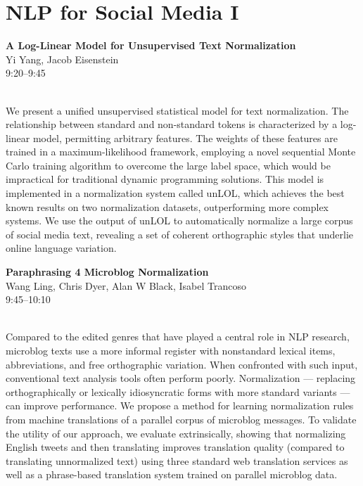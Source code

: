 \documentclass[twoside,makeidx]{book}
\begin{document}
\section{NLP for Social Media I}
\vspace{-1em}
\par\vspace{2em}\noindent%
\begin{minipage}{\linewidth}%
\begin{center}
\textbf{\normalsize A Log-Linear Model for Unsupervised Text Normalization}\\
\normalsize  Yi Yang,  Jacob Eisenstein\\
{\small 9:20--9:45}\\
\end{center}
\end{minipage}\\[0.5em]
\nopagebreak%
\noindent%
{\small We present a unified unsupervised statistical model for text normalization. The relationship between standard and non-standard tokens is characterized by a log-linear model, permitting arbitrary features.  The weights of these features are trained in a maximum-likelihood framework, employing a novel sequential Monte Carlo training algorithm to overcome the large label space, which would be impractical for traditional dynamic programming solutions. This model is implemented in a normalization system called unLOL, which achieves the best known results on two normalization datasets, outperforming more complex systems. We use the output of unLOL to automatically normalize a large corpus of social media text, revealing a set of coherent orthographic styles that underlie online language variation.}
\par\vspace{2em}\noindent%
\begin{minipage}{\linewidth}%
\begin{center}
\textbf{\normalsize Paraphrasing 4 Microblog Normalization}\\
\normalsize  Wang Ling,  Chris Dyer,  Alan W Black,  Isabel Trancoso\\
{\small 9:45--10:10}\\
\end{center}
\end{minipage}\\[0.5em]
\nopagebreak%
\noindent%
{\small Compared to the edited genres that have played a central role in NLP research, microblog texts use a more informal register with nonstandard lexical items, abbreviations, and free orthographic variation. When confronted with such input, conventional text analysis tools often perform poorly. Normalization --- replacing orthographically or lexically idiosyncratic forms with more standard variants --- can improve performance. We propose a method for learning normalization rules from machine translations of a parallel corpus of microblog messages. To validate the utility of our approach, we evaluate extrinsically, showing that normalizing English tweets and then translating improves translation quality (compared to translating unnormalized text) using three standard web translation services as well as a phrase-based translation system trained on parallel microblog data.}
\end{document}
